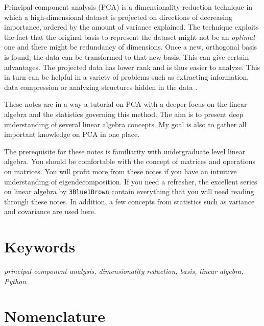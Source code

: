 \documentclass[10pt,twocolumn]{article}
\begin{document}
\setlength{\parindent}{0em}
\setlength{\parskip}{1em}

Principal component analysis (PCA) is a dimensionality reduction technique in which a high-dimensional dataset is projected on directions of decreasing importance, ordered by the amount of variance explained. The technique exploits the fact that the original basis to represent the dataset might not be an \textit{optimal} one and there might be redundancy of dimensions. Once a new, orthogonal basis is found, the data can be transformed to that new basis. This can give certain advantages. The projected data has lower rank and is thus easier to analyze. This in turn can be helpful in a variety of problems such as extracting information, data compression or analyzing structures hidden in the data \cite{Abdi_Williams}.

These notes are in a way a tutorial on PCA with a deeper focus on the linear algebra and the statistics governing this method. The aim is to present deep understanding of several linear algebra concepts. My goal is also to gather all important knowledge on PCA in one place. 

The prerequisite for these notes is familiarity with undergraduate level linear algebra. You should be comfortable with the concept of matrices and operations on matrices. You will profit more from these notes if you have an intuitive understanding of eigendecomposition. If you need a refresher, the excellent series on linear algebra by \texttt{3Blue1Brown} \cite{3Blue1Brown} contain everything that you will need reading through these notes. In addition, a few concepts from statistics such as variance and covariance are used here.

\section*{Keywords}

\textit{principal component analysis, dimensionality reduction, basis, linear algebra, Python}

\newpage

\tableofcontents

\section*{Nomenclature}
\end{document}
